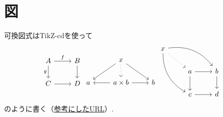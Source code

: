 \documentclass[11pt,a4paper,oneside,lualatex]{ltjsarticle} %
\begin{document}
%
%
%


\section{図} \label{sec:diag}


可換図式はTikZ-cdを使って
\[
\begin{tikzcd}
	A \ar[r, "f"] \arrow[d, "g"'] & B \ar[d] \\
	C \ar[r] & D
\end{tikzcd}
\begin{tikzcd}
	& x \arrow[ld] \arrow[d, dotted] \arrow[rd] & \\
	a & a\times b \arrow[l] \arrow[r] & b
\end{tikzcd}
\begin{tikzcd}
	x \arrow[ddr, bend right] \arrow[rrd, bend left] \arrow[rd, dotted] & & \\
	& a \arrow[r] \arrow[d] & b \arrow[d] \\
	& c \arrow[r] & d
\end{tikzcd}
\]
のように書く（\href{https://blog.miz-ar.info/2017/06/commutative-diagrams-in-latex/}{参考にしたURL}）.

%
\end{document}
